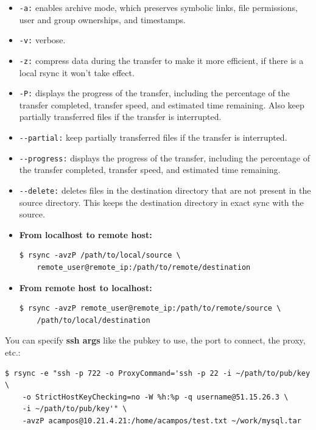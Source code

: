 \documentclass{article}
\newenvironment{codetemplate}[1][]{%
  \mybasecolorbox[#1]
  \itshape
}{%
  \endmybasecolorbox
}
\begin{document}
\begin{itemize}
    \item \verb|-a:| enables archive mode, which preserves symbolic links, file permissions, user and group ownerships, and timestamps.
    \item \verb|-v:| verbose.
    \item \verb|-z:| compress data during the transfer to make it more efficient, if there is a local rsync it won't take effect.
    \item \verb|-P:| displays the progress of the transfer, including the percentage of the transfer completed, transfer speed, and estimated time remaining. Also keep partially transferred files if the transfer is interrupted.
    \item \verb|--partial:| keep partially transferred files if the transfer is interrupted.
    \item \verb|--progress:| displays the progress of the transfer, including the percentage of the transfer completed, transfer speed, and estimated time remaining.
    \item \verb|--delete:| deletes files in the destination directory that are not present in the source directory. This keeps the destination directory in exact sync with the source.
    \item \textbf{From localhost to remote host:}
\begin{codetemplate}{}
\begin{verbatim}
$ rsync -avzP /path/to/local/source \
    remote_user@remote_ip:/path/to/remote/destination
\end{verbatim}
\end{codetemplate}

    \item \textbf{From remote host to localhost:} 
\begin{codetemplate}{}
\begin{verbatim}
$ rsync -avzP remote_user@remote_ip:/path/to/remote/source \
    /path/to/local/destination 
\end{verbatim}
\end{codetemplate}
\end{itemize}

You can specify \textbf{ssh args} like the pubkey to use, the port to connect, the proxy, etc.:
\begin{codetemplate}{}
\begin{verbatim}
$ rsync -e "ssh -p 722 -o ProxyCommand='ssh -p 22 -i ~/path/to/pub/key \ 
    -o StrictHostKeyChecking=no -W %h:%p -q username@51.15.26.3 \
    -i ~/path/to/pub/key'" \
    -avzP acampos@10.21.4.21:/home/acampos/test.txt ~/work/mysql.tar 
\end{verbatim}
\end{codetemplate}
\end{document}
